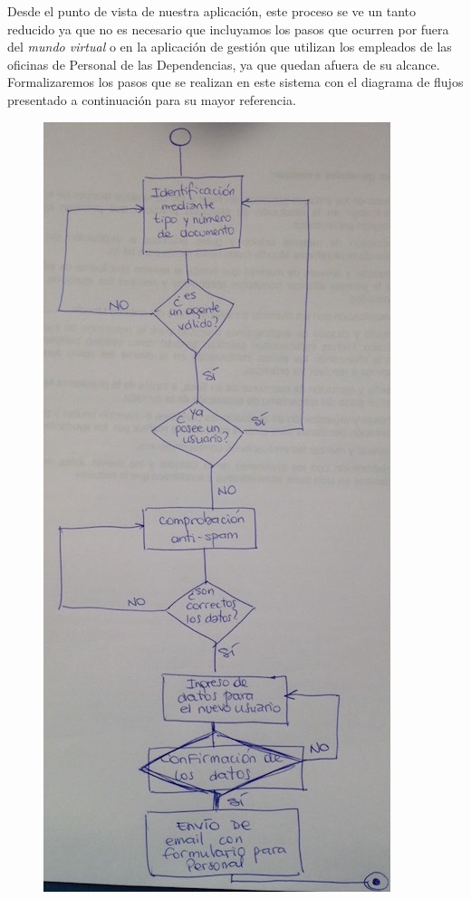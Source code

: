 Desde el punto de vista de nuestra aplicación, este proceso se ve un tanto reducido ya que no es necesario que incluyamos los pasos que ocurren por fuera del \textit{mundo virtual} o en la aplicación de gestión que utilizan los empleados de las oficinas de Personal de las Dependencias, ya que quedan afuera de su alcance. Formalizaremos los pasos que se realizan en este sistema con el diagrama de flujos presentado a continuación para su mayor referencia.

\begin{figure}[H]
  \centering
  \includegraphics[width=\textwidth,height=0.5\textheight,keepaspectratio]{src/images/05-capitulo-5/diagrama-flujo-registro.jpg}

\end{figure}
